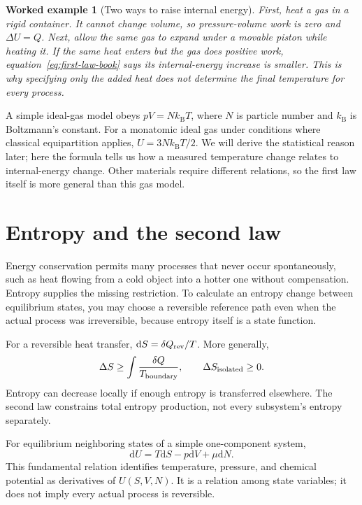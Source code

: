 \documentclass[11pt,oneside]{book}
\newcommand{\dd}{\mathrm{d}}
\newcommand{\kb}{k_{\mathrm B}}
\theoremstyle{reviewstyle}
\newtheorem{example}{Worked example}[chapter]
\begin{document}
\begin{example}[Two ways to raise internal energy]
First, heat a gas in a rigid container. It cannot change volume, so pressure-volume work is zero and $\Delta U=Q$. Next, allow the same gas to expand under a movable piston while heating it. If the same heat enters but the gas does positive work, equation~\eqref{eq:first-law-book} says its internal-energy increase is smaller. This is why specifying only the added heat does not determine the final temperature for every process.
\end{example}

A simple ideal-gas model obeys $pV=N\kb T$, where $N$ is particle number and $\kb$ is Boltzmann's constant. For a monatomic ideal gas under conditions where classical equipartition applies, $U=3N\kb T/2$. We will derive the statistical reason later; here the formula tells us how a measured temperature change relates to internal-energy change. Other materials require different relations, so the first law itself is more general than this gas model.

\section{Entropy and the second law}
Energy conservation permits many processes that never occur spontaneously, such as heat flowing from a cold object into a hotter one without compensation. Entropy supplies the missing restriction. To calculate an entropy change between equilibrium states, you may choose a reversible reference path even when the actual process was irreversible, because entropy itself is a state function.

For a reversible heat transfer, $\dd S=\delta Q_{\rm rev}/T$. More generally,
\begin{equation}\Delta S\geq\int\frac{\delta Q}{T_{\rm boundary}},\qquad \Delta S_{\rm isolated}\geq0.\end{equation}
Entropy can decrease locally if enough entropy is transferred elsewhere. The second law constrains total entropy production, not every subsystem's entropy separately.

For equilibrium neighboring states of a simple one-component system,
\begin{equation}\boxed{\dd U=T\dd S-p\dd V+\mu\dd N.}\end{equation}
This fundamental relation identifies temperature, pressure, and chemical potential as derivatives of $U(S,V,N)$. It is a relation among state variables; it does not imply every actual process is reversible.
\end{document}
